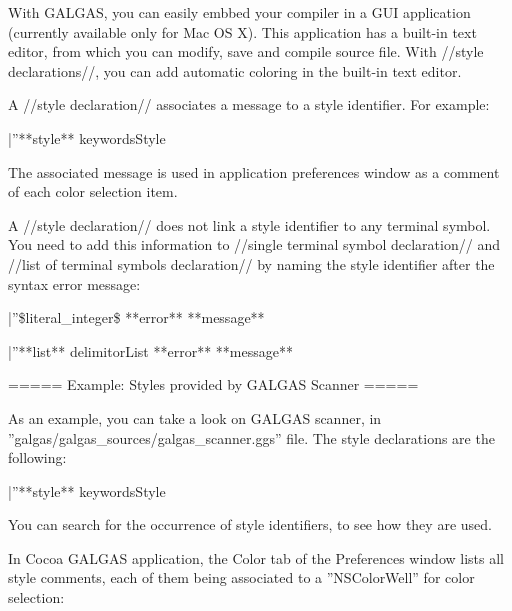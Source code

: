 {With GALGAS, you can easily embbed your compiler in a GUI application (currently available only for Mac OS X). This application has a built-in text editor, from which you can modify, save and compile source file. With //style declarations//, you can add automatic coloring in the built-in text editor.

A //style declaration// associates a message to a style identifier. For example:

|''**style** keywordsStyle %

The associated message is used in application preferences window as a comment of each color selection item.

A //style declaration// does not link a style identifier to any terminal symbol. You need to add this information to //single terminal symbol declaration// and //list of terminal symbols declaration// by naming the style identifier after the syntax error message:

|''\$literal\_integer\$ **error** **message** %

|''**list** delimitorList **error** **message** %

===== Example: Styles provided by GALGAS Scanner =====

As an example, you can take a look on GALGAS scanner, in ''galgas/galgas\_sources/galgas\_scanner.ggs'' file. The style declarations are the following:

|''**style** keywordsStyle %

You can search for the occurrence of style identifiers, to see how they are used.

In Cocoa GALGAS application, the Color tab of the Preferences window lists all style comments, each of them being associated to a ''NSColorWell'' for color selection:

}
